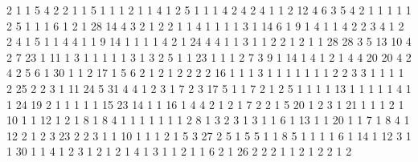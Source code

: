 \documentclass[11pt,a4paper]{book}
\begin{document}
\begin{enumerate}
\begin{itemize}
				2  1  1  5  4  2  2  1  1  5  1  1  1  2  1  1 4  1  2  5  1  1  1  4  2  4  2  4  1  1  2 12 4  6  3  5  4  2  1  1  1  1  1  2  5  1  1  1 6  1  2  1 28 14  4  3  2  1  2  2  1  1  4  1 1  1  1  3  1 14  6  1  9  1  4  1  1  4  2  2 3  4  1  2  2  4  1  5  1  1  4  4  1  1  9 14 1  1  1  1  4  2  1 24  4  4  1  1  3  1  1  2 2  1  2  1  1 28 28  3  5 13 10  4  2  7 23  1 11  1  3  1  1  1  1  1  3  1  3  2  5  1  1 23 1  1  1  2  7  3  9  1 14  1  4  1  2  1  4  4 20 20  4  2  4  2  5  6  1 30  1  1  2 17  1  5 6  2  1  2  1  2  2  2  2 16  1  1  1  3  1  1 1  1  1  1  1  2  2  3  3  1  1  1  1  2 25  2 2  3  1 11 24  5 31  4  4  1  2  3  1  7  2  3 17  5  1  1  7  2  1  2  5  1  1  1  1 13  1  1 1  1  1  4  1  1 24 19  2  1  1  1  1  1 15 23 14  1  1 16  1  4  4  2  1  2  1  7  2  2  1  5 20  1  2  3  1 21  1  1  1  2  1 10  1  1 12  1 2  1  8  1  8  4  1  1  1  1  1  1  1  2  8  1 3  2  3  1  3  1  1  6  1 13  1  1 20  1  1  7 1  8  4  1 12  2  1  2  3 23  2  2  3  1  1 10 1  1  1  2  1  5  3 27  2  5  1  5  5  1  1  8 5  1  1  1  1  6  1 14  1 12  3  1  1 30  1  1 4  1  2  3  1  2  1  2  1  4  1  3  1  1  2  1 1  6  2  1 26  2  2  2  1  1  2  1  2  2  1  2
			\end{itemize}
	\end{enumerate}
\end{document}
